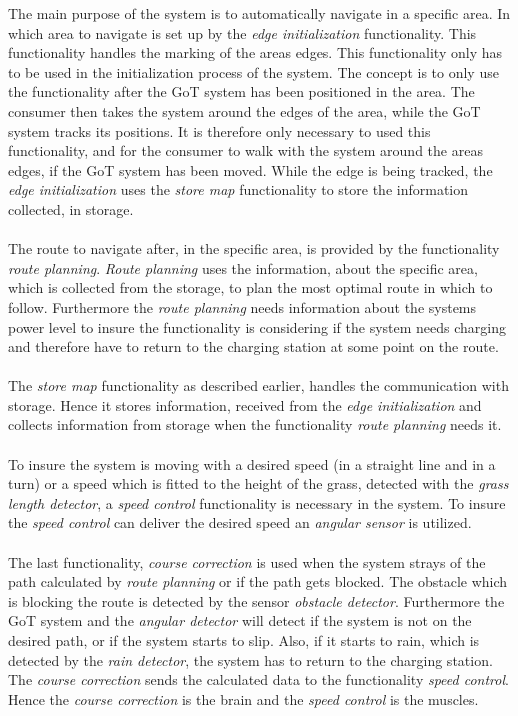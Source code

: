 \noindent
The main purpose of the system is to automatically navigate in a specific area. In which area to navigate is set up by the \textit{edge initialization} functionality. This functionality handles the marking of the areas edges. This functionality only has to be used in the initialization process of the system. The concept is to only use the functionality after the GoT system has been positioned in the area. The consumer then takes the system around the edges of the area, while the GoT system tracks its positions. It is therefore only necessary to used this functionality, and for the consumer to walk with the system around the areas edges, if the GoT system has been moved. While the edge is being tracked, the \textit{edge initialization} uses the \textit{store map} functionality to store the information collected, in storage. \\\\ 
\noindent
The route to navigate after, in the specific area, is provided by the functionality \textit{route planning}. \textit{Route planning} uses the information, about the specific area, which is collected from the storage, to plan the most optimal route in which to follow. Furthermore the \textit{route planning} needs information about the systems power level to insure the functionality is considering if the system needs charging and therefore have to return to the charging station at some point on the route.\\\\
\noindent
The \textit{store map} functionality as described earlier, handles the communication with storage. Hence it stores information, received from the \textit{edge initialization} and collects information from storage when the functionality \textit{route planning} needs it. \\\\
\noindent
To insure the system is moving with a desired speed (in a straight line and in a turn) or a speed which is fitted to the height of the grass, detected with the \textit{grass length detector}, a \textit{speed control} functionality is necessary in the system. To insure the \textit{speed control} can deliver the desired speed an \textit{angular sensor} is utilized. \\\\
\noindent
The last functionality, \textit{course correction} is used when the system strays of the path calculated by \textit{route planning} or if the path gets blocked.
The obstacle which is blocking the route is detected by the sensor \textit{obstacle detector}. Furthermore the GoT system and the \textit{angular detector} will detect if the system is not on the desired path, or if the system starts to slip. Also, if it starts to rain, which is detected by the \textit{rain detector}, the system has to return to the charging station.
The \textit{course correction} sends the calculated data to the functionality \textit{speed control}. Hence the \textit{course correction} is the brain and the \textit{speed control} is the muscles.\\\\
